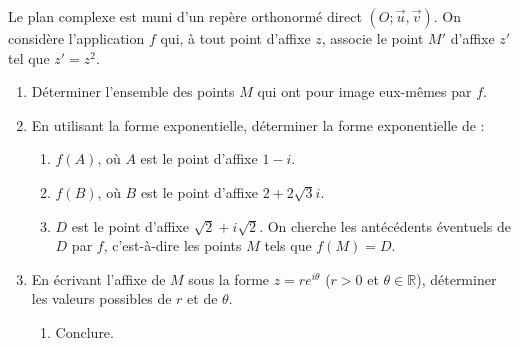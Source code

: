 \documentclass[a4paper,12pt]{article}
\begin{document}
\begin{tcolorbox}[title={Exercice 25}]
Le plan complexe est muni d'un repère orthonormé direct \( (O ; \vec{u}, \vec{v}) \). On considère l'application \( f \) qui, à tout point d'affixe \( z \), associe le point \( M' \) d'affixe \( z' \) tel que \( z' = z^2 \).

\begin{enumerate}
    \item Déterminer l'ensemble des points \( M \) qui ont pour image eux-mêmes par \( f \).
    \item En utilisant la forme exponentielle, déterminer la forme exponentielle de :
       \begin{enumerate}
           \item \( f(A) \), où \( A \) est le point d'affixe \( 1 - i \).
           \item \( f(B) \), où \( B \) est le point d'affixe \( 2 + 2\sqrt{3}i \).
           \item \( D \) est le point d'affixe \( \sqrt{2} + i\sqrt{2} \). On cherche les antécédents éventuels de \( D \) par \( f \), c'est-à-dire les points \( M \) tels que \( f(M) = D \).
       \end{enumerate}
    \item En écrivant l'affixe de \( M \) sous la forme \( z = re^{i\theta} \) (\( r > 0 \) et \( \theta \in \mathbb{R} \)), déterminer les valeurs possibles de \( r \) et de \( \theta \).
       \begin{enumerate}
           \item Conclure.
       \end{enumerate}
\end{enumerate}
\end{tcolorbox}
\end{document}
